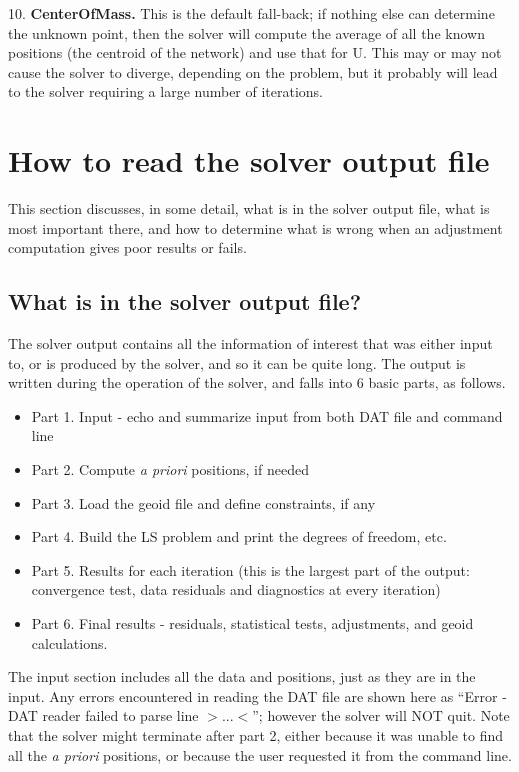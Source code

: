 10. \textbf{CenterOfMass.} This is the default fall-back; if nothing else can determine the unknown point, then the solver will compute the average of all the known positions (the centroid of the network) and use that for U. This may or may not cause the solver to diverge, depending on the problem, but it probably will lead to the solver requiring a large number of iterations.


\section{How to read the solver output file}
\label{sec:howtoreadoutfile}
This section discusses, in some detail, what is in the solver output file, what is most important there, and how to determine what is wrong when an adjustment computation gives poor results or fails.

\subsection{What is in the solver output file?}
The solver output contains all the information of interest that was either input to, or is produced by the solver, and so it can be quite long. The output is written during the operation of the solver, and falls into 6 basic parts, as follows.

\begin{itemize}
\item Part 1. Input - echo and summarize input from both DAT file and command line
\item Part 2. Compute \emph{a priori} positions, if needed
\item Part 3. Load the geoid file and define constraints, if any
\item Part 4. Build the LS problem and print the degrees of freedom, etc.
\item Part 5. Results for each iteration (this is the largest part of the output: convergence test, data residuals and diagnostics at every iteration)
\item Part 6. Final results - residuals, statistical tests, adjustments, and geoid calculations.
\end{itemize}

The input section includes all the data and positions, just as they are in the input. Any errors encountered in reading the DAT file are shown here as ``Error - DAT reader failed to parse line $>...<$''; however the solver will NOT quit. Note that the solver might terminate after part 2, either because it was unable to find all the \emph{a priori} positions, or because the user requested it from the command line.

